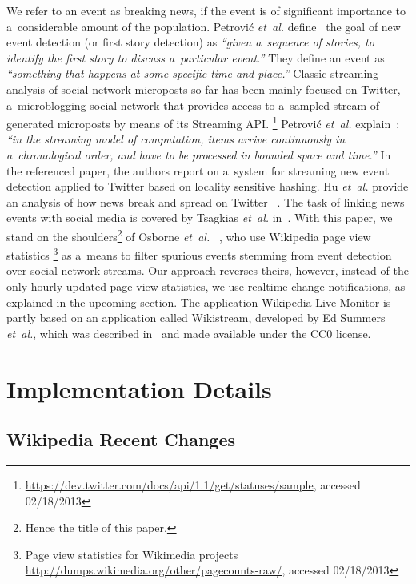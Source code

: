 \documentclass{sig-alternate}
\newcommand{\inlinelistingsize}{\fontsize{8pt}{11pt}}
\let\oldurl\url
\renewcommand{\url}[1]{\inlinelistingsize\oldurl{#1}}
\begin{document}
We refer to an event as breaking news, if the event is of significant importance
to a~considerable amount of the population.
Petrovi\'{c} \emph{et~al.} define~\cite{petrovic2010streamingfirststory}
the goal of new event detection (or first story detection) as
\textit{``given a~sequence of stories, to identify the first story
to discuss a~particular event.''}
They define an event as \textit{``something that happens
at some specific time and place.''}
Classic streaming analysis of social network microposts so far has been mainly
focused on Twitter, a~microblogging social network that provides access
to a~sampled stream of generated microposts by means of its Streaming API.%
\footnote{\url{https://dev.twitter.com/docs/api/1.1/get/statuses/sample},
accessed 02/18/2013}
Petrovi\'{c} \emph{et~al.} explain~\cite{petrovic2010streamingfirststory}:
\textit{``in the streaming model of computation,
items arrive continuously in a~chronological order, and have to be
processed in bounded space and time.''}
In the referenced paper, the authors report on a~system for streaming
new event detection applied to Twitter based on locality sensitive hashing.
Hu \emph{et~al.} provide an analysis of how news break and spread on Twitter~%
\cite{hu2012breakingnews}.
The task of linking news events with social media is covered by Tsagkias
\emph{et~al.} in~\cite{tsagkias2011linkingonlinenews}.
With this paper, we stand on the shoulders\footnote{Hence the title of this paper.}
of Osborne \emph{et~al.}~%
\cite{osborne2012bieber}, who use Wikipedia page view statistics%
\footnote{Page view statistics for Wikimedia projects \url{http://dumps.wikimedia.org/other/pagecounts-raw/},
accessed 02/18/2013}
as a~means to filter spurious events
stemming from event detection over social network streams.
Our approach reverses theirs, however, instead of the only hourly updated
page view statistics, we use realtime change notifications,
as explained in the upcoming section.
The application Wikipedia Live Monitor is partly based on an application called
Wikistream, developed by Ed Summers \emph{et~al.}, which was described in~%
\cite{summers2011odetonode} and made available under the CC0 license.

\section{Implementation Details}

\subsection{Wikipedia Recent Changes}
\end{document}
